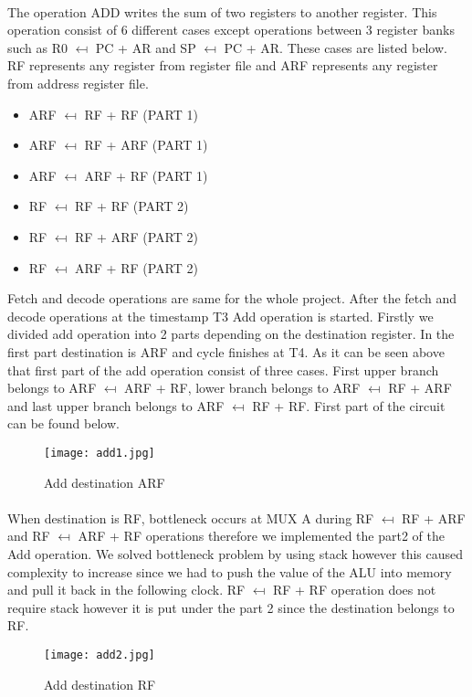 \documentclass{article}
\begin{document}
\paragraph{}
The operation ADD writes the sum of two registers to another register. This operation consist of 6 different cases except operations between 3 register banks such as  R0 $\mapsfrom$ PC + AR and SP  $\mapsfrom$ PC + AR. These cases are listed below. RF represents any register from register file and  ARF represents any register from address register file.
\begin{itemize}
    \item ARF $\mapsfrom$ RF + RF (PART 1)
    \item ARF $\mapsfrom$ RF + ARF (PART 1)
    \item ARF $\mapsfrom$ ARF + RF (PART 1)
    \item RF $\mapsfrom$ RF + RF   (PART 2)
    \item RF $\mapsfrom$ RF + ARF  (PART 2)
    \item RF $\mapsfrom$ ARF + RF  (PART 2) 
    
\end{itemize}
Fetch and decode operations are same for the whole project. After the fetch and decode operations at the timestamp T3 Add operation is started. Firstly we divided add operation into 2 parts depending on the destination register. In the first part destination is ARF and cycle finishes at T4. As it can be seen above that first part of the add operation consist of three cases. First upper branch belongs to  ARF $\mapsfrom$ ARF + RF, lower branch belongs to ARF $\mapsfrom$ RF + ARF and last upper branch belongs to ARF $\mapsfrom$ RF + RF. First part of the circuit can be found below.
\begin{figure}[!ht]
    \centering
    \texttt{[image: add1.jpg]}
    \caption{Add destination ARF  }
    \label{fig:my_label}
\end{figure}
\paragraph{}
When destination is RF, bottleneck occurs at MUX A during RF $\mapsfrom$ RF + ARF and  RF $\mapsfrom$ ARF + RF operations therefore we implemented the part2 of the Add operation. We solved bottleneck problem by using stack however this caused complexity to increase since we had to push the value of the ALU into memory and pull it back in the following clock. RF $\mapsfrom$ RF + RF operation does not require stack however it is put under the part 2 since the destination belongs to RF.
\begin{figure}[h]
    \centering
    \texttt{[image: add2.jpg]}
    \caption{Add destination RF  }
    \label{fig:my_label}
\end{figure}
\end{document}

